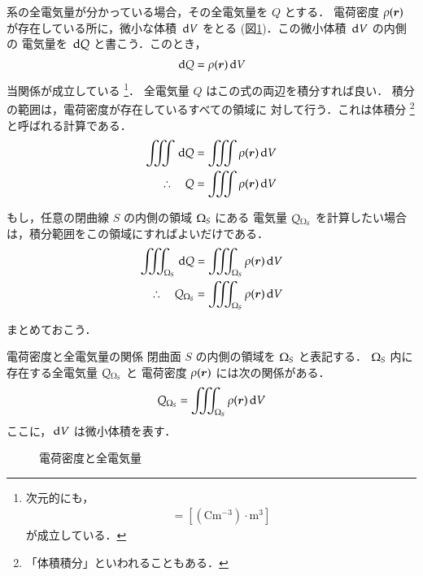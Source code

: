     系の全電気量が分かっている場合，その全電気量を $Q$ とする．
    電荷密度 $\rho(\boldsymbol{r})$ が存在している所に，微小な体積 $\,\mathrm{d} V$ をとる
    (図\ref{fig:EM_DenkamdV})．この微小体積 $\,\mathrm{d} V$ の内側の
    電気量を $\,\mathrm{d} Q$ と書こう．このとき，
        \begin{align*}
            \,\mathrm{d} Q = \rho(\boldsymbol{r})\,\mathrm{d} V
        \end{align*}
    当関係が成立している
        \footnote{
            次元的にも，
            \begin{align*}
                [\mathrm{C}] = [\mathrm{(Cm^{-3})\cdot m^{3}}]
            \end{align*}
            が成立している．
        }．
    全電気量 $Q$ はこの式の両辺を積分すれば良い．
    積分の範囲は，電荷密度が存在しているすべての領域に
    対して行う．これは体積分
        \footnote{
            「体積積分」といわれることもある．
        }
    と呼ばれる計算である．
        \begin{align}
            \vint \df Q &= \vint \rho(\br)\df V \notag \\
            \therefore \quad
                     Q &= \vint \rho(\br)\df V
        \end{align}

    もし，任意の閉曲線 $S$ の内側の領域 $\Omega_{S}$ にある
    電気量 $Q_{\Omega_{S}}$ を計算したい場合は，積分範囲をこの領域にすればよいだけである．
        \begin{align}
            \vint_{\OmegaS} \df Q &= \vint_{\OmegaS} \rho(\br)\df V \notag \\
            \therefore \quad
                     Q_{\OmegaS} &= \vint_{\OmegaS} \rho(\br)\df V
        \end{align}

    まとめておこう．
        \begin{myshadebox}{電荷密度と全電気量の関係}
            閉曲面 $S$ の内側の領域を $\Omega_{S}$ と表記する．
            $\Omega_{S}$ 内に存在する全電気量 $Q_{\Omega_{S}}$ と
            電荷密度 $\rho(\boldsymbol{r})$ には次の関係がある．
            \begin{align}
                Q_{\Omega_{S}} = \int\mspace{-11mu}\int\mspace{-11mu}\int_{\Omega_{S}} \rho(\boldsymbol{r})\,\mathrm{d} V
            \end{align}
            ここに，$\,\mathrm{d} V$ は微小体積を表す．
        \end{myshadebox}

        \begin{figure}[hbt]
            \begin{center}
                \caption{電荷密度と全電気量}
                \label{fig:EM_DenkamdV}
            \end{center}
        \end{figure}

